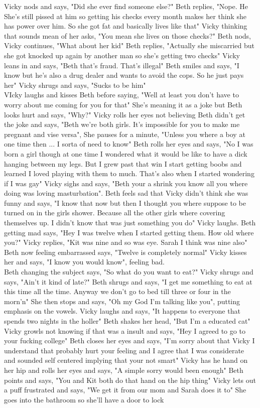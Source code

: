 \documentclass{article}[12px] %
\begin{document}
Vicky nods and says, "Did she ever find someone else?" Beth replies, "Nope. He She's still pissed at him so getting his checks every month makes her think she has power over him. So she got fat and basically lives like that" Vicky thinking that sounds mean of her asks, "You mean she lives on those checks?" Beth nods, Vicky continues, "What about her kid" Beth replies, "Actually she miscarried but she got knocked up again by another man so she's getting two checks" Vicky leans in and says, "Beth that's fraud. That's illegal" Beth smiles and says, "I know but he's also a drug dealer and wants to avoid the cops. So he just pays her" Vicky shrugs and says, "Sucks to be him"\\

VIcky laughs and kisses Beth before saying, "Well at least you don't have to worry about me coming for you for that" She's meaning it as a joke but Beth looks hurt and says, "Why?" Vicky rolls her eyes not believing Beth didn't get the joke and says, "Beth we're both girls. It's impossible for you to make me pregnant and vise versa", She pauses for a minute, "Unless you where a boy at one time then ... I sorta of need to know" Beth rolls her eyes and says, "No I was born a girl though at one time I wondered what it would be like to have a dick hanging between my legs. But I grew past that win I start getting boobs and learned I loved playing with them to much. That's also when I started wondering if I was gay" Vicky sighs and says, "Beth your a shrink you know all you where doing was loving masturbation". Beth feels sad that Vicky didn't think she was funny and says, "I know that now but then I thought you where suppose to be turned on in the girls shower. Because all the other girls where covering themselves up. I didn't know that was just something you do" Vicky laughs. Beth getting mad says, "Hey I was twelve when I started getting them. How old where you?" Vicky replies, "Kit was nine and so was eye. Sarah I think was nine also" Beth now feeling embarrassed says, "Twelve is completely normal" Vicky kisses her and says, "I know you would know", feeling bad.\\

Beth changing the subject says, "So what do you want to eat?" Vicky shrugs and says, "Ain't it kind of late?" Beth shrugs and says, "I get me something to eat at this time all the time. Anyway we don't go to bed till three or four in the morn'n" She then stops and says, "Oh my God I'm talking like you", putting emphasis on the vowels.  Vicky laughs and says, "It happens to everyone that spends two nights in the holler" Beth shakes her head, "But I'm a educated cat" Vicky growls not knowing if that was a insult and says, "Hey I agreed to go to your fucking college" Beth closes her eyes and says, "I'm sorry about that Vicky I understand that probably hurt your feeling and I agree that I was considerate and sounded self centered implying that your not smart" Vicky has he hand on her hip and rolls her eyes and says, "A simple sorry would been enough" Beth points and says, "You and Kit both do that hand on the hip thing" Vicky lets out a puff frustrated and says, "We get it from our mom and Sarah does it to" She goes into the bathroom so she'll have a door to lock
\end{document}
